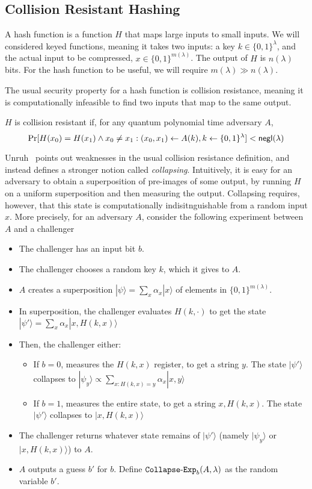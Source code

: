 \subsection{Collision Resistant Hashing}

A hash function is a function $H$ that maps large inputs to small inputs.  We will considered keyed functions, meaning it takes two inputs: a key $k\in\{0,1\}^\lambda$, and the actual input to be compressed, $x\in\{0,1\}^{m(\lambda)}$.  The output of $H$ is $n(\lambda)$ bits.  For the hash function to be useful, we will require $m(\lambda)\gg n(\lambda)$.

The usual security property for a hash function is collision resistance, meaning it is computationally infeasible to find two inputs that map to the same output.
\begin{definition}$H$ is collision resistant if, for any quantum polynomial time adversary $A$,
	\[\Pr[H(x_0)=H(x_1)\wedge x_0\neq x_1:(x_0,x_1)\gets A(k),k\gets\{0,1\}^\lambda]<{\sf negl}(\lambda)\]
\end{definition}

Unruh~\cite{EC:Unruh16} points out weaknesses in the usual collision resistance definition, and instead defines a stronger notion called \emph{collapsing}.  Intuitively, it is easy for an adversary to obtain a superposition of pre-images of some output, by running $H$ on a uniform superposition and then measuring the output.  Collapsing requires, however, that this state is computationally indisitnguishable from a random input $x$.  More precisely, for an adversary $A$, consider the following experiment between $A$ and a challenger
\begin{itemize}
	\item The challenger has an input bit $b$.
	\item The challenger chooses a random key $k$, which it gives to $A$.
	\item $A$ creates a superposition $|\psi\rangle=\sum_x \alpha_x |x\rangle$ of elements in $\{0,1\}^{m(\lambda)}$.
	\item In superposition, the challenger evaluates $H(k,\cdot)$ to get the state $|\psi'\rangle=\sum_x \alpha_x |x,H(k,x)\rangle$
	\item Then, the challenger either:
	\begin{itemize}
		\item If $b=0$, measures the $H(k,x)$ register, to get a string $y$.  The state $|\psi'\rangle$ collapses to $|\psi_y\rangle\propto\sum_{x:H(k,x)=y}\alpha_x|x,y\rangle$
		\item If $b=1$, measures the entire state, to get a string $x,H(k,x)$.  The state $|\psi'\rangle$ collapses to $|x,H(k,x)\rangle$
	\end{itemize}
	\item The challenger returns whatever state remains of $|\psi'\rangle$ (namely $|\psi_y\rangle$ or $|x,H(k,x)\rangle$) to $A$.
	\item $A$ outputs a guess $b'$ for $b$.  Define ${\tt{Collapse\text{-}Exp}}_b(A,\lambda)$ as the random variable $b'$.
\end{itemize}

